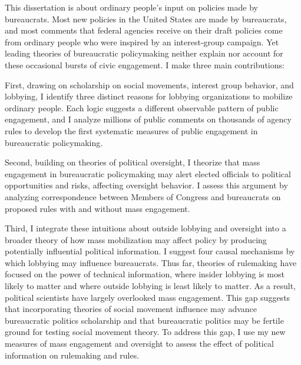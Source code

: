 This dissertation is about ordinary people's input on policies made by bureaucrats. Most new policies in the United States are made by bureaucrats, and most comments that federal agencies receive on their draft policies come from ordinary people who were inspired by an interest-group campaign. Yet leading  theories  of bureaucratic policymaking neither explain nor account for these occasional bursts of civic engagement.
I make three main contributions:

First, drawing on scholarship on social movements, interest group behavior, and lobbying, I identify three distinct reasons for lobbying organizations to mobilize ordinary people. Each logic suggests a different observable pattern of public engagement, and I analyze millions of public comments on thousands of agency rules to develop the first systematic measures of public engagement in bureaucratic policymaking. 

Second, building on theories of political oversight, I theorize that mass engagement in bureaucratic policymaking may alert elected officials to political opportunities and risks, affecting oversight behavior. I assess this argument by analyzing correspondence between Members of Congress and bureaucrats on proposed rules with and without mass engagement.

Third, I integrate these intuitions about outside lobbying and oversight into a broader theory of how mass mobilization may affect policy by producing potentially influential political information. I suggest four causal mechanisms by which lobbying may influence bureaucrats. Thus far, theories of rulemaking have focused on the power of technical information, where insider lobbying is most likely to matter and where outside lobbying is least likely to matter. As a result, political scientists have largely overlooked mass engagement. This gap suggests that incorporating theories of social movement influence may advance bureaucratic politics scholarship and that bureaucratic politics may be fertile ground for testing social movement theory. To address this gap, I use my new measures of mass engagement and oversight to assess the effect of political information on rulemaking and rules.%


